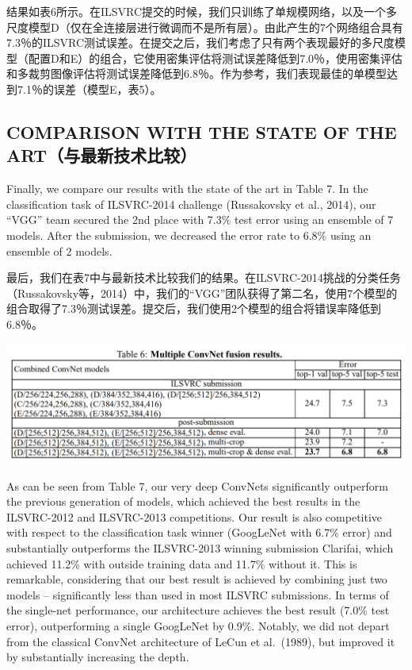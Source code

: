 \documentclass[12pt,a4paper,UTF8,twoside]{book}
\begin{document}
结果如表6所示。在ILSVRC提交的时候，我们只训练了单规模网络，以及一个多尺度模型D（仅在全连接层进行微调而不是所有层）。由此产生的7个网络组合具有7.3％的ILSVRC测试误差。在提交之后，我们考虑了只有两个表现最好的多尺度模型（配置D和E）的组合，它使用密集评估将测试误差降低到7.0％，使用密集评估和多裁剪图像评估将测试误差降低到6.8％。作为参考，我们表现最佳的单模型达到7.1％的误差（模型E，表5）。

\hypertarget{comparison-with-the-state-of-the-artux4e0eux6700ux65b0ux6280ux672fux6bd4ux8f83}{%
\subsection{COMPARISON WITH THE STATE OF THE ART（与最新技术比较）}\label{comparison-with-the-state-of-the-artux4e0eux6700ux65b0ux6280ux672fux6bd4ux8f83}}

Finally, we compare our results with the state of the art in Table 7. In the classification task of ILSVRC-2014 challenge (Russakovsky et al., 2014), our ``VGG'' team secured the 2nd place with 7.3\% test error using an ensemble of 7 models. After the submission, we decreased the error rate to 6.8\% using an ensemble of 2 models.

最后，我们在表7中与最新技术比较我们的结果。在ILSVRC-2014挑战的分类任务（Russakovsky等，2014）中，我们的``VGG''团队获得了第二名，使用7个模型的组合取得了7.3％测试误差。提交后，我们使用2个模型的组合将错误率降低到6.8％。

\begin{center}\includegraphics[width=0.7\linewidth]{img/03-06} \end{center}

As can be seen from Table 7, our very deep ConvNets significantly outperform the previous generation of models, which achieved the best results in the ILSVRC-2012 and ILSVRC-2013 competitions. Our result is also competitive with respect to the classification task winner (GoogLeNet with 6.7\% error) and substantially outperforms the ILSVRC-2013 winning submission Clarifai, which achieved 11.2\% with outside training data and 11.7\% without it. This is remarkable, considering that our best result is achieved by combining just two models -- significantly less than used in most ILSVRC submissions. In terms of the single-net performance, our architecture achieves the best result (7.0\% test error), outperforming a single GoogLeNet by 0.9\%. Notably, we did not depart from the classical ConvNet architecture of LeCun et al.~(1989), but improved it by substantially increasing the depth.
\end{document}
